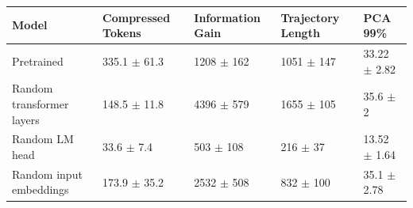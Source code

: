 \begin{tabular}{lllll}
\toprule
 Model                     & Compressed Tokens         & Information Gain        & Trajectory Length       & PCA 99\%                   \\
\midrule
 Pretrained                & 335.1 {\small $\pm$ 61.3} & 1208 {\small $\pm$ 162} & 1051 {\small $\pm$ 147} & 33.22 {\small $\pm$ 2.82} \\
 Random transformer layers & 148.5 {\small $\pm$ 11.8} & 4396 {\small $\pm$ 579} & 1655 {\small $\pm$ 105} & 35.6 {\small $\pm$ 2}     \\
 Random LM head            & 33.6 {\small $\pm$ 7.4}   & 503 {\small $\pm$ 108}  & 216 {\small $\pm$ 37}   & 13.52 {\small $\pm$ 1.64} \\
 Random input embeddings   & 173.9 {\small $\pm$ 35.2} & 2532 {\small $\pm$ 508} & 832 {\small $\pm$ 100}  & 35.1 {\small $\pm$ 2.78}  \\
\bottomrule
\end{tabular}
